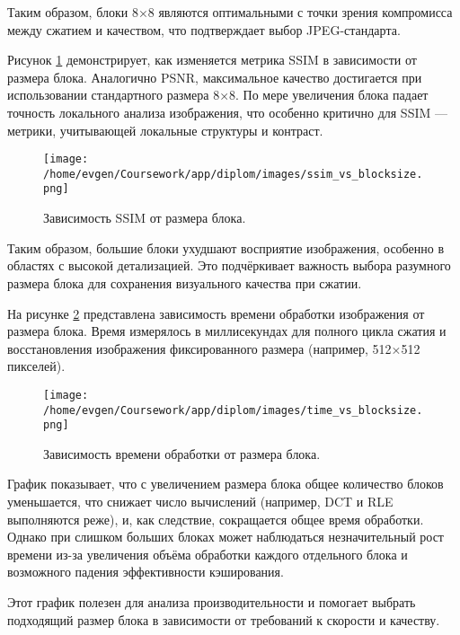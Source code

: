 Таким образом, блоки 8×8 являются оптимальными с точки зрения компромисса между сжатием и качеством, 
что подтверждает выбор JPEG-стандарта.

Рисунок \ref{fig:ssim_vs_blocksize} демонстрирует, как изменяется метрика SSIM в зависимости от размера блока. 
Аналогично PSNR, максимальное качество достигается при использовании стандартного размера 8×8. 
По мере увеличения блока падает точность локального анализа изображения, 
что особенно критично для SSIM — метрики, учитывающей локальные структуры и контраст.

\begin{figure}[H]
    \centering
    \texttt{[image: /home/evgen/Coursework/app/diplom/images/ssim\_vs\_blocksize.png]}
    \caption{Зависимость SSIM от размера блока.}
    \label{fig:ssim_vs_blocksize}
\end{figure}

Таким образом, большие блоки ухудшают восприятие изображения, особенно в областях с высокой детализацией. 
Это подчёркивает важность выбора разумного размера блока для сохранения визуального качества при сжатии.


На рисунке \ref{fig:time_vs_blocksize} представлена зависимость времени обработки изображения от размера блока. 
Время измерялось в миллисекундах для полного цикла сжатия и восстановления изображения фиксированного 
размера (например, 512×512 пикселей).

\begin{figure}[H]
    \centering
    \texttt{[image: /home/evgen/Coursework/app/diplom/images/time\_vs\_blocksize.png]}
    \caption{Зависимость времени обработки от размера блока.}
    \label{fig:time_vs_blocksize}
\end{figure}

График показывает, что с увеличением размера блока общее количество блоков уменьшается, 
что снижает число вычислений (например, DCT и RLE выполняются реже), и, как следствие, 
сокращается общее время обработки. 
Однако при слишком больших блоках может наблюдаться незначительный рост времени из-за увеличения объёма 
обработки каждого отдельного блока и возможного падения эффективности кэширования.

Этот график полезен для анализа производительности и помогает выбрать подходящий размер блока в 
зависимости от требований к скорости и качеству.